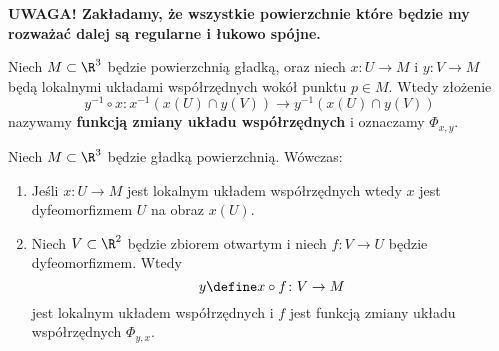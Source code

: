 \begin{frame}[<+->]

\begin{uwaga}
\textbf{UWAGA! Zakładamy, że wszystkie powierzchnie które będzie my rozważać dalej są regularne i łukowo spójne.}
\end{uwaga}

\end{frame}
\begin{frame}[<+->]

\begin{definicja}
Niech $M\subset\R^3$ będzie powierzchnią gładką, oraz niech $x\colon U\to M$ i $y\colon V\to M$ będą lokalnymi układami współrzędnych wokół punktu $p\in M$. Wtedy złożenie \[y^{-1}\circ x\colon x^{-1}(x(U)\cap y(V))\to y^{-1}(x(U)\cap y(V))\]
nazywamy \textbf{funkcją zmiany układu współrzędnych} i oznaczamy $\Phi_{x,y}$.

\end{definicja}
\end{frame}
\begin{frame}[<+->]
\begin{center}

\end{center}

\end{frame}
\begin{frame}


\begin{lemat}\label{lem:chart_loc_bij}
Niech $M\subset \R^3$ będzie gładką powierzchnią. Wówczas:
\begin{enumerate}[<+->]
\item Jeśli $x\colon U\to M$ jest lokalnym układem współrzędnych wtedy $x$ jest dyfeomorfizmem $U$ na obraz $x(U)$. %
\item Niech $V\subset \R^2$ będzie zbiorem otwartym i niech $f\colon V\to U$ będzie dyfeomorfizmem. Wtedy \[y\define x\circ f\colon V\to M\] jest lokalnym układem współrzędnych i $f$ jest funkcją zmiany układu współrzędnych $\Phi_{y,x}$.
\end{enumerate}
\end{lemat}

\end{frame}
